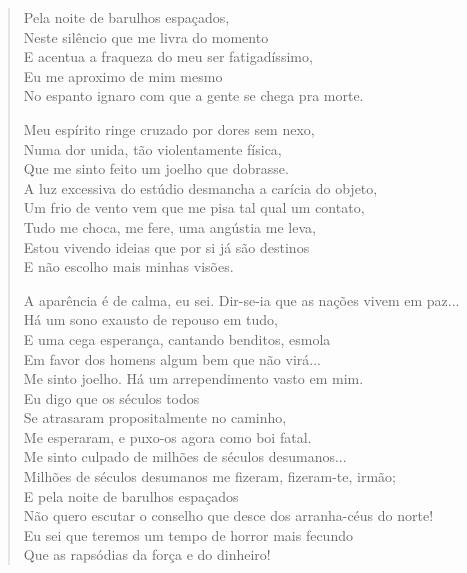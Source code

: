 \begin{verse}
Pela noite de barulhos espaçados,\\
Neste silêncio que me livra do momento\\
E acentua a fraqueza do meu ser fatigadíssimo,\\
Eu me aproximo de mim mesmo\\
No espanto ignaro com que a gente se chega pra morte.

Meu espírito ringe cruzado por dores sem nexo,\\
Numa dor unida, tão violentamente física,\\
Que me sinto feito um joelho que dobrasse.\\
A luz excessiva do estúdio desmancha a carícia do objeto,\\
Um frio de vento vem que me pisa tal qual um contato,\\
Tudo me choca, me fere, uma angústia me leva,\\
Estou vivendo ideias que por si já são destinos\\
E não escolho mais minhas visões.

A aparência é de calma, eu sei. Dir-se-ia que as nações vivem em paz...\\
Há um sono exausto de repouso em tudo,\\
E uma cega esperança, cantando benditos, esmola\\
Em favor dos homens algum bem que não virá...\\
Me sinto joelho. Há um arrependimento vasto em mim.\\
Eu digo que os séculos todos\\
Se atrasaram propositalmente no caminho,\\
Me esperaram, e puxo-os agora como boi fatal.\\
Me sinto culpado de milhões de séculos desumanos...\\
Milhões de séculos desumanos me fizeram, fizeram-te, irmão;\\
E pela noite de barulhos espaçados\\
Não quero escutar o conselho que desce dos arranha-céus do norte!\\
Eu sei que teremos um tempo de horror mais fecundo\\
Que as rapsódias da força e do dinheiro!


\end{verse}
